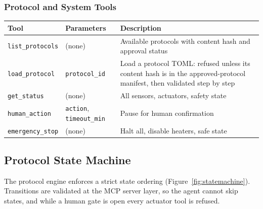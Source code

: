 \documentclass[11pt,letterpaper]{article}
\begin{document}
\subsubsection{Protocol and System Tools}

{\centering\begin{tabularx}{\textwidth}{L{3.3cm} L{5.4cm} Y}
\toprule
\textbf{Tool} & \textbf{Parameters} & \textbf{Description} \\
\midrule
\texttt{list\_protocols} & (none) & Available protocols with content hash and approval status \\
\texttt{load\_protocol} & \texttt{protocol\_id} & Load a protocol TOML: refused unless its content hash is in the approved-protocol manifest, then validated step by step \\
\texttt{get\_status} & (none) & All sensors, actuators, safety state \\
\texttt{human\_action} & \texttt{action}, \texttt{timeout\_min} & Pause for human confirmation \\
\texttt{emergency\_stop} & (none) & Halt all, disable heaters, safe state \\
\bottomrule
\end{tabularx}\par}


\subsection{Protocol State Machine}

The protocol engine enforces a strict state ordering (Figure~\ref{fig:statemachine}). Transitions are validated at the MCP server layer, so the agent cannot skip states, and while a human gate is open every actuator tool is refused.
\end{document}
